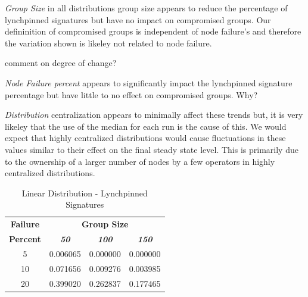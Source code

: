 \documentclass[conference]{IEEEtran}
\begin{document}
\textit{Group Size} in all distributions group size appears to reduce the percentage
of lynchpinned signatures but have no impact on compromised groups. Our defininition of compromised
groups is independent of node failure's and therefore the variation shown is likeley not related to
node failure.

comment on degree of change?

\textit{Node Failure percent} appears to significantly impact the lynchpinned signature percentage
but have little to no effect on compromised groups. Why?

\textit{Distribution} centralization appears to minimally affect these trends but, it is very likeley
that the use of the median for each run is the cause of this. We would expect that highly centralized
distributions would cause fluctuations in these values similar to their effect on the final steady state 
level. This is primarily due to the ownership of a larger number of nodes by a few operators in highly 
centralized distributions. 

        \begin{table}[h!]
            \caption{Linear Distribution - Lynchpinned Signatures}
            \begin{center}
            \begin{tabular}{|c|c|c|c|}
            \hline
            \textbf{Failure}&\multicolumn{3}{|c|}{\textbf{Group Size}} \\
            \cline{2-4} 
            \textbf{Percent} & \textbf{\textit{50}}& \textbf{\textit{100}}& \textbf{\textit{150}} \\
            \hline
            5 &  0.006065 &  0.000000 &  0.000000 \\
            \hline
            10 &  0.071656 &  0.009276 &  0.003985 \\
            \hline
            20 &  0.399020 &  0.262837 &  0.177465 \\
            \hline
            \end{tabular}
            \label{lynchpinned_table1}
            \end{center}
        \end{table}
\end{document}
